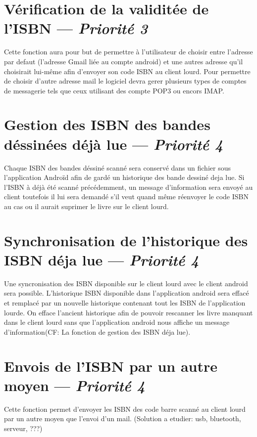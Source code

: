\section[Envois du mail contenant l'ISBN via une autre adresse mail]{Vérification de la validitée de l'ISBN — \emph{Priorité 3}}
Cette fonction aura pour but de permettre à l'utilisateur de choisir entre l'adresse par defaut (l'adresse Gmail liée au compte android) et une autres adresse qu'il choisirait lui-même afin d'envoyer son code ISBN au client lourd. Pour permettre de choisir d'autre adresse mail le logiciel devra gerer plusieurs types de comptes de messagerie tels que ceux utilisant des compte POP3 ou encors IMAP.


\section[Gestion des ISBN des bandes déssinées déjà lue]{Gestion des ISBN des bandes déssinées déjà lue — \emph{Priorité 4}}
Chaque ISBN des bandes déssiné scanné sera conservé dans un fichier sous l'application Androïd afin de gardé un historique des bande dessiné deja lue. Si l'ISBN à déjà été scanné précédemment, un message d'information sera envoyé au client toutefois il lui sera demandé s'il veut quand même réenvoyer le code ISBN au cas ou il aurait suprimer le livre sur le client lourd. 

\section[Synchronisation de l'historique des ISBN déja lue]{Synchronisation de l'historique des ISBN déja lue — \emph{Priorité 4}}
Une syncronisation des ISBN disponible sur le client lourd avec le client android sera possible. L'historique ISBN disponible dans l'application android sera effacé et remplacé par un nouvelle historique contenant tout les ISBN de l'application lourde. On efface l'ancient historique afin de pouvoir rescanner les livre manquant dans le client lourd sans que l'application android nous affiche un message d'information(CF: La fonction de gestion des ISBN déja lue).

\section[Envois de l'ISBN par un autre moyen]{Envois de l'ISBN par un autre moyen — \emph{Priorité 4}}
Cette fonction permet d'envoyer les ISBN des code barre scanné au client lourd par un autre moyen que l'envoi d'un mail. (Solution a etudier: usb, bluetooth, serveur, ???)
